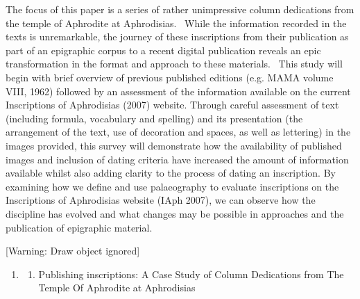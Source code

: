 \documentclass[amsthm,ebook]{saparticle}
\begin{document}
The focus of this paper is a series of rather unimpressive column dedications from the temple of Aphrodite at
Aphrodisias. \ While the information recorded in the texts is unremarkable, the journey of these inscriptions from
their publication as part of an epigraphic corpus to a recent digital publication reveals an epic transformation in the
format and approach to these materials. \ This study will begin with brief overview of previous published editions
(e.g. MAMA volume VIII, 1962) followed by an assessment of the information available on the current Inscriptions of
Aphrodisias (2007) website. Through careful assessment of text (including formula, vocabulary and spelling) and its
presentation (the arrangement of the text, use of decoration and spaces, as well as lettering) in the images provided,
this survey will demonstrate how the availability of published images and inclusion of dating criteria have increased
the amount of information available whilst also adding clarity to the process of dating an inscription. By examining
how we define and use palaeography to evaluate inscriptions on the Inscriptions of Aphrodisias website (IAph 2007), we
can observe how the discipline has evolved and what changes may be possible in approaches and the publication of
epigraphic material. 


\bigskip


\bigskip


\bigskip


\bigskip


\bigskip


\bigskip


\bigskip


\bigskip

[Warning: Draw object ignored]


\bigskip


\bigskip


\bigskip


\bigskip


\bigskip


\bigskip


\bigskip


\bigskip


\bigskip


\bigskip

\begin{enumerate}
\item \begin{enumerate}
\item Publishing inscriptions: A Case Study of Column Dedications from The Temple Of Aphrodite at Aphrodisias 
\end{enumerate}
\end{enumerate}
\end{document}
